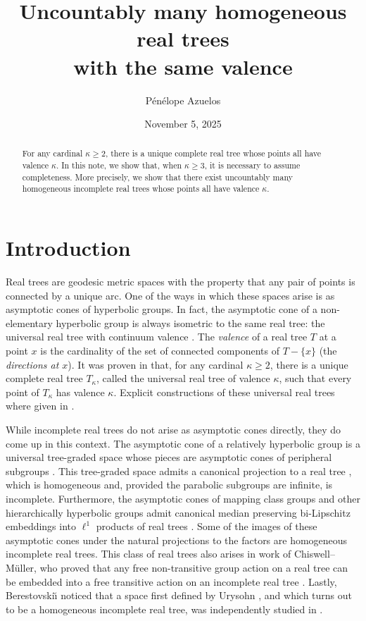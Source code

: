 \documentclass[11pt]{article}
\title{Uncountably many homogeneous real trees \\ with the same valence}
\author{Pénélope Azuelos}
\date{November 5, 2025}
\theoremstyle{definition}
\theoremstyle{remark}
\begin{document}
\maketitle

\begin{abstract}
For any cardinal $\kappa \geq 2$, there is a unique complete real tree whose points all have valence $\kappa$. In this note, we show that, when $\kappa \geq 3$, it is necessary to assume completeness. More precisely, we show that there exist uncountably many homogeneous incomplete real trees whose points all have valence $\kappa$.
\end{abstract}

\section{Introduction}

Real trees are geodesic metric spaces with the property that any pair of points is connected by a unique arc. One of the ways in which these spaces arise is as asymptotic cones of hyperbolic groups. In fact, the asymptotic cone of a non-elementary hyperbolic group is always isometric to the same real tree: the universal real tree with continuum valence \cite{DyubinaExplicit01}. The \textit{valence} of a real tree $T$ at a point $x$ is the cardinality of the set of connected components of $T - \{x\}$ (the \textit{directions at $x$}). It was proven in \cite{MayerUniversal92,NikielTopologies89} that, for any cardinal $\kappa \geq 2$, there is a unique complete real tree $T_\kappa$, called the universal real tree of valence $\kappa$, such that every point of $T_\kappa$ has valence $\kappa$. Explicit constructions of these universal real trees where given in \cite{DyubinaExplicit01}.

While incomplete real trees do not arise as asymptotic cones directly, they do come up in this context. The asymptotic cone of a relatively hyperbolic group is a universal tree-graded space whose pieces are asymptotic cones of peripheral subgroups \cite{OsinUNIVERSAL11,SistoTreegraded13}. This tree-graded space admits a canonical projection to a real tree \cite[Section~2.3]{DrutuGroups08}, which is homogeneous and, provided the parabolic subgroups are infinite, is incomplete. Furthermore, the asymptotic cones of mapping class groups and other hierarchically hyperbolic groups admit canonical median preserving bi-Lipschitz embeddings into $\ell^1$ products of real trees \cite{BehrstockMedian11,Casals-RuizReal24}. Some of the images of these asymptotic cones under the natural projections to the factors are homogeneous incomplete real trees. This class of real trees also arises in work of Chiswell--M\"{u}ller, who proved that any free non-transitive group action on a real tree can be embedded into a free transitive action on an incomplete real tree \cite{ChiswellEmbedding10}. Lastly, Berestovski\u{\i} \cite{BerestovskiuiUryson19} noticed that a space first defined by Urysohn \cite{UrysohnBeispiel27}, and  which turns out to be a homogeneous incomplete real tree, was independently studied in \cite{BerestovskiuiQuasicones89,PolterovichAsymptotic97}. 
\end{document}
